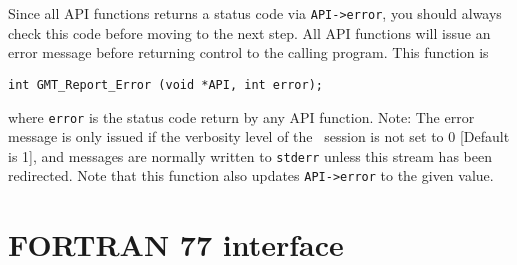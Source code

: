 \documentclass[11pt]{report}
\begin{document}
Since all API functions returns a status code via \texttt{API->error}, you should always check this code before
moving to the next step.  All API functions will issue an error message before returning control
to the calling program.  This function is

\begin{verbatim}
int GMT_Report_Error (void *API, int error);
\end{verbatim}
where \texttt{error} is the status code return by any API function.  Note: The error message is
only issued if the verbosity level of the \GMT\ session is not set to 0 [Default is 1], and
messages are normally written to \texttt{stderr} unless this stream has been redirected.
Note that this function also updates \texttt{API->error} to the given value.
\section{FORTRAN 77 interface} 
\end{document}
